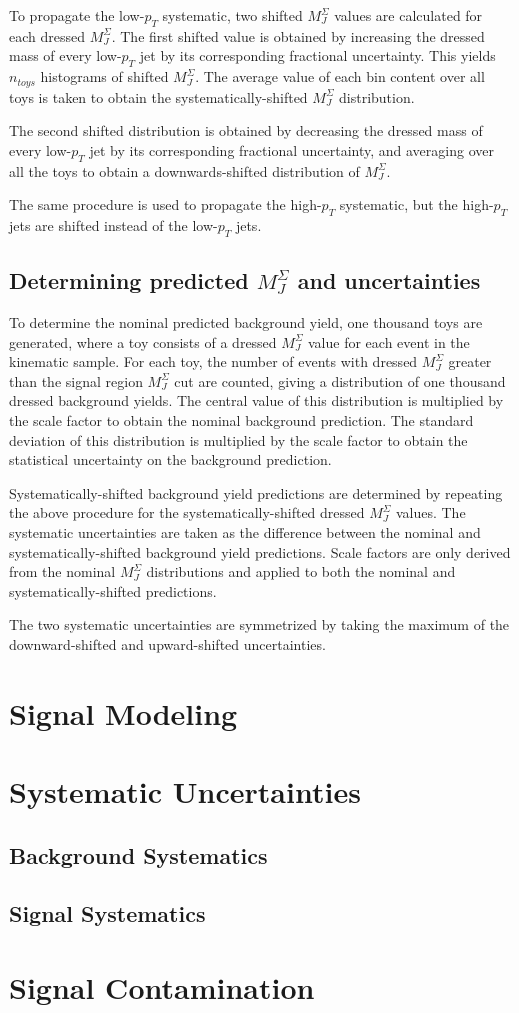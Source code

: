To propagate the low-$p_T$ systematic, two shifted $M_{J}^{\Sigma}$
values are calculated for each dressed $M_{J}^{\Sigma}$. The first
shifted value is obtained by increasing the dressed mass of every
low-$p_T$ jet by its corresponding fractional uncertainty. This yields
$n_{toys}$ histograms of shifted $M_{J}^{\Sigma}$. The average value
of each bin content over all toys is taken to obtain the
systematically-shifted $M_{J}^{\Sigma}$ distribution. 

The second
shifted distribution is obtained by decreasing the dressed mass of every
low-$p_T$ jet by its corresponding fractional uncertainty, and
averaging over all the toys to obtain a downwards-shifted distribution
of $M_{J}^{\Sigma}$. 

The same procedure is used to propagate the high-$p_T$ systematic, but
the high-$p_T$ jets are shifted instead of the low-$p_T$ jets.
\subsection{Determining predicted $M_{J}^{\Sigma}$ and uncertainties}
To determine the nominal predicted background yield, one thousand toys
are generated, where a toy consists of a dressed $M_{J}^{\Sigma}$ value for
each event in the kinematic sample. For each toy, the number of events
with dressed $M_{J}^{\Sigma}$ greater than the signal region
$M_{J}^{\Sigma}$ cut are counted, giving a distribution of one
thousand dressed background yields. The central value of this distribution is
multiplied by the scale factor to obtain the nominal background
prediction. The standard deviation of this distribution is multiplied
by the scale factor to obtain the statistical uncertainty on the
background prediction.

Systematically-shifted background yield predictions are determined by repeating
the above procedure for the systematically-shifted dressed
$M_{J}^{\Sigma}$ values. The systematic uncertainties are taken as the
difference between the nominal and systematically-shifted background
yield predictions. Scale factors are only derived from the nominal
$M_{J}^{\Sigma}$ distributions and applied to both the nominal and
systematically-shifted predictions.

The two systematic uncertainties are symmetrized by taking the maximum
of the downward-shifted and upward-shifted uncertainties.
\section{Signal Modeling}
\section{Systematic Uncertainties}
\subsection{Background Systematics}
\subsection{Signal Systematics}
\section{Signal Contamination}
